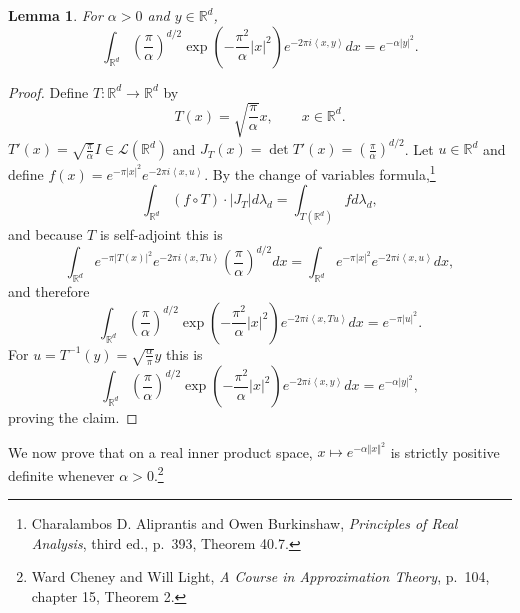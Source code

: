 \documentclass{article}
\newcommand{\inner}[2]{\left\langle #1, #2 \right\rangle}
\newcommand{\norm}[1]{\left\Vert #1 \right\Vert}
\newtheorem{lemma}[theorem]{Lemma}
\theoremstyle{definition}
\begin{document}
\begin{lemma}
For $\alpha>0$ and $y \in \mathbb{R}^d$,
\[
\int_{\mathbb{R}^d} \left(\frac{\pi}{\alpha}\right)^{d/2} \exp\left(-\frac{\pi^2}{\alpha} |x|^2\right)
e^{-2\pi i\inner{x}{y}} dx  = e^{-\alpha |y|^2}.
\]
\label{gaussian}
\end{lemma}
\begin{proof}
Define $T:\mathbb{R}^d \to \mathbb{R}^d$ by
\[
T(x) =  \sqrt{\frac{\pi}{\alpha}}x, \qquad x \in \mathbb{R}^d.
\]
$T'(x)= \sqrt{\frac{\pi}{\alpha}}I \in \mathscr{L}(\mathbb{R}^d)$ and $J_T(x)=\det T'(x) = \left(\frac{\pi}{\alpha}\right)^{d/2}$. 
Let $u \in \mathbb{R}^d$ and define  $f(x) = e^{-\pi |x|^2} e^{-2\pi i\inner{x}{u}}$.
By the change of variables formula,\footnote{Charalambos D. Aliprantis and Owen Burkinshaw, {\em Principles of Real Analysis}, third ed.,
p.~393, Theorem 40.7.}
\[
 \int_{\mathbb{R}^d} (f \circ T) \cdot  |J_T| d\lambda_d=
\int_{T(\mathbb{R}^d)} fd\lambda_d,
\]
and because $T$ is self-adjoint this is
\[
 \int_{\mathbb{R}^d} 
e^{-\pi |T(x)|^2} e^{-2\pi i\inner{x}{Tu}}
 \left(\frac{\pi}{\alpha}\right)^{d/2} dx=
\int_{\mathbb{R}^d} e^{-\pi |x|^2} e^{-2\pi i\inner{x}{u}} dx,
\]
and therefore
\[
\int_{\mathbb{R}^d}  \left(\frac{\pi}{\alpha}\right)^{d/2}  \exp\left(-\frac{\pi^2}{\alpha} |x|^2 \right)  e^{-2\pi i\inner{x}{Tu}} dx
=e^{-\pi|u|^2}.
\]
For $u = T^{-1}(y)=\sqrt{\frac{\alpha}{\pi}}y$ this is
\[
\int_{\mathbb{R}^d}  \left(\frac{\pi}{\alpha}\right)^{d/2}  \exp\left(-\frac{\pi^2}{\alpha} |x|^2 \right)  e^{-2\pi i\inner{x}{y}} dx
=e^{-\alpha |y|^2},
\]
proving the claim.
\end{proof}


We now prove that on a real inner product space, $x \mapsto e^{-\alpha \norm{x}^2}$ is strictly positive definite whenever
$\alpha>0$.\footnote{Ward Cheney and Will Light, {\em A Course
in Approximation Theory}, p.~104, chapter 15, Theorem 2.}
\end{document}
